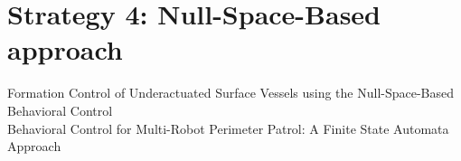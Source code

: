 \section{Strategy 4: Null-Space-Based approach}
Formation Control of Underactuated Surface Vessels using the
Null-Space-Based Behavioral Control \citep{arrichiello2006formation}\\
Behavioral Control for Multi-Robot Perimeter Patrol: A Finite State
Automata Approach \citep{marino2009behavioral}\\
